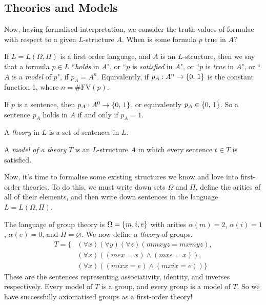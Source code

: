 \documentclass{article}
\begin{document}

\subsection{Theories and Models}
\label{section-first-order-theories}

Now, having formalised interpretation, we consider the truth values of formulae with respect to a given $L$-structure $A$. When is some formula $p$ true in $A$?

\begin{definition}[Model]
	\label{first-order-predicate-model}
    If $L = L(\Omega, \Pi)$ is a first order language, and $A$ is an $L$-structure, then we say that a formula $p \in L$ ``\textit{holds} in $A$", or ``$p$ is \textit{satisfied} in $A$", or ``$p$ is \textit{true} in $A$", or ``$A$ is a \textit{model} of $p$", if $p_A = A^n$. Equivalently, if $p_A : A^n \to \left\lbrace 0, \, 1 \right\rbrace$ is the constant function 1, where $n = \# \mathrm{FV}(p)$.
\end{definition}

\begin{corollary}
	If $p$ is a sentence, then $p_A : A^0 \to \left\lbrace 0, \, 1 \right\rbrace$, or equivalently $p_A \in \left\lbrace 0, \, 1 \right\rbrace$. So a sentence $p_A$ holds in $A$ if and only if $p_A = 1$.
\end{corollary}

\begin{definition}[Theory]
    A \textit{theory} in $L$ is a set of sentences in $L$.
    
    A \textit{model of a theory} $T$ is an $L$-structure $A$ in which every sentence $t \in T$ is satisfied.
\end{definition}

Now, it's time to formalise some existing structures we know and love into first-order theories. To do this, we must write down sets $\Omega$ and $\Pi$, define the arities of all of their elements, and then write down sentences in the language $L = L(\Omega, \Pi)$.

\begin{example}
    The language of group theory is $\Omega = \left\lbrace m, i, e \right\rbrace$ with arities $\alpha(m) = 2$, $\alpha(i) = 1$, $\alpha(e) = 0$, and $\Pi = \varnothing$. We now define  a \textit{theory} of groups.
    \begin{align*}
    	T = \{ &(\forall x)(\forall y)(\forall z)(mmxyz = mxmyz), \\
    	&(\forall x)((mex = x) \land (mxe = x)), \\
    	&(\forall x)((mixx = e) \land (mxix = e)) \}
	\end{align*}
	These are the sentences representing associativity, identity, and inverses respectively. Every model of $T$ is a group, and every group is a model of $T$. So we have successfully axiomatised groups as a first-order theory!
\end{example}
\end{document}
